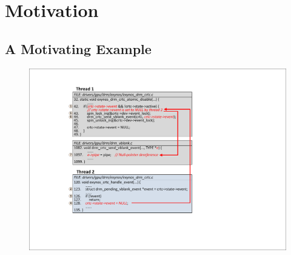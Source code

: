 \section{Motivation}
\label{sec_motivation}

\subsection{A Motivating Example}
\label{subsec_motivating_example}

\begin{figure}[htbp]
	\centering
	\includegraphics[width=1\linewidth]{figures/fig_demo_bug.pdf}
	\label{fig_demo_bug}
\end{figure}

